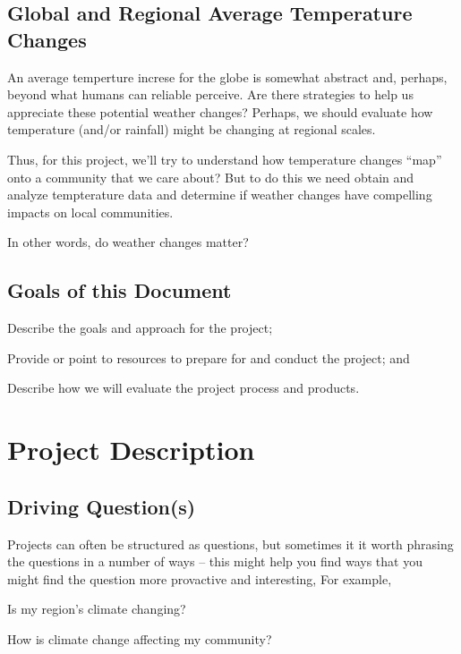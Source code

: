 \documentclass{article}\usepackage[]{graphicx}\usepackage[]{color}
\newenvironment{itemize*}%
  {\begin{itemize}%
    \setlength{\itemsep}{0pt}%
    \setlength{\parskip}{0pt}}%
  {\end{itemize}}
\newenvironment{enumerate*}%
  {\begin{enumerate}%
    \setlength{\itemsep}{0pt}%
    \setlength{\parskip}{0pt}}%
  {\end{enumerate}}
\begin{document}
\subsection{Global and Regional Average Temperature Changes}

An average temperture increse for the globe is somewhat abstract and, perhaps, beyond what humans can reliable perceive. Are there strategies to help us appreciate these potential weather changes? Perhaps, we should evaluate how temperature (and/or rainfall) might be changing at regional scales. 

Thus, for this project, we'll try to understand how temperature changes ``map'' onto a community that we care about? But to do this we need obtain and analyze tempterature data and determine if weather changes have compelling impacts on local communities.

In other words, do weather changes matter?

\subsection{Goals of this Document}

\begin{enumerate*}
  \item Describe the goals and approach for the project;
  \item Provide or point to resources to prepare for and conduct the project; and
  \item Describe how we will evaluate the project process and products.
\end{enumerate*}

\section{Project Description}

\subsection{Driving Question(s)}

Projects can often be structured as questions, but sometimes it it worth phrasing the questions in a number of ways -- this might help you find ways that you might find the question more provactive and interesting, For example,

\begin{itemize*}
  \item Is my region's climate changing?
  \item How is climate change affecting my community?
\end{itemize*}
\end{document}
